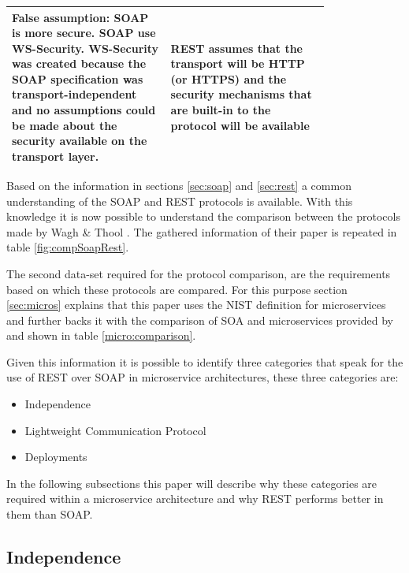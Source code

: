 \documentclass[conference]{IEEEtran}
\begin{document}
\begin{table}[!htbp]
\begin{tabular}{| p{0.4\linewidth} | p{0.4\linewidth}|}
		False assumption: SOAP is more secure. SOAP use WS-Security. WS-Security was created because the SOAP specification was transport-independent and no assumptions could be made about the security available on the transport layer. & REST assumes that the transport will be HTTP (or HTTPS) and the security mechanisms that are built-in to the protocol will be available\\\hline
	\end{tabular}
\end{table}

Based on the information in sections \ref{sec:soap} and \ref{sec:rest} a common understanding of the SOAP and REST protocols is available. With this knowledge it is now possible to understand the comparison between the protocols made by Wagh \& Thool \cite{wagh2012comparative}. The gathered information of their paper is repeated in table \ref{fig:compSoapRest}.

The second data-set required for the protocol comparison, are the requirements based on which these protocols are compared. For this purpose section \ref{sec:micros} explains that this paper uses the NIST definition \cite{karmel2016nist} for microservices and further backs it with the comparison of SOA and microservices provided by \cite{karmel2016nist} and shown in table \ref{micro:comparison}.

Given this information it is possible to identify three categories that speak for the use of REST over SOAP in microservice architectures, these three categories are:

\begin{itemize}
	\item Independence
	\item Lightweight Communication Protocol
	\item Deployments
\end{itemize} 

In the following subsections this paper will describe why these categories are required within a microservice architecture and why REST performs better in them than SOAP.

\subsection{Independence}
\end{document}
